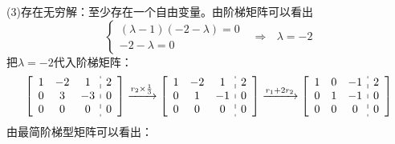 \documentclass[a4paper]{report}
\begin{document}
\begin{jie}
(3)存在无穷解：至少存在一个自由变量。由阶梯矩阵可以看出
\begin{equation*}
  \begin{cases}
    (\lambda-1)(-2-\lambda)=0\\
    -2-\lambda=0
  \end{cases}
  ~~~\Rightarrow~~~\lambda=-2
\end{equation*}
把$\lambda=-2$代入阶梯矩阵：
\begin{equation*}
\left[
\begin{array}{c:c}
\begin{matrix}
1& -2 & 1 \\
0 & 3 & -3  \\
0 & 0 & 0 \\
\end{matrix}
&
\begin{matrix}
2 \\
0 \\
0 \\
\end{matrix}
\end{array}
\right]
\xrightarrow{ r_{2}\times\frac{1}{3}}
{\left[
\begin{array}{c:c}
\begin{matrix}
1& -2 & 1 \\
0 & 1 & -1  \\
0 & 0 & 0 \\
\end{matrix}
&
\begin{matrix}
2 \\
0 \\
0 \\
\end{matrix}
\end{array}
\right]
}
\xrightarrow{ r_{1}+2r_{2}}
{\left[
\begin{array}{c:c}
\begin{matrix}
1& 0 & -1 \\
0 & 1 & -1  \\
0 & 0 & 0 \\
\end{matrix}
&
\begin{matrix}
2 \\
0 \\
0 \\
\end{matrix}
\end{array}
\right]
}
\end{equation*}
由最简阶梯型矩阵可以看出：
\begin{equation*}

\end{equation*}
\end{jie}
\end{document}
